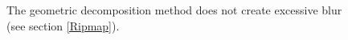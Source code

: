 
\begin{figure}
\caption{The geometric decomposition method does not create excessive blur (see section \ref{Ripmap}).}
\label{Homo2}
\end{figure}




